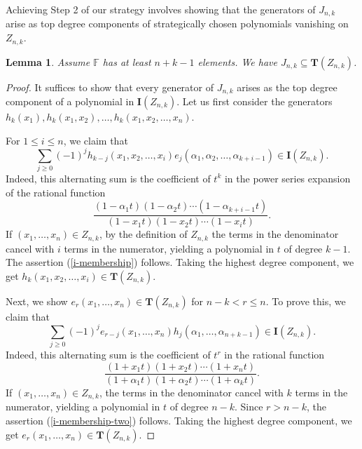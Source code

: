 \documentclass[10pt]{amsart}
\newtheorem{lemma}[theorem]{Lemma}
\theoremstyle{definition}
\newcommand{\FF}{{\mathbb{F}}}
\newcommand{\II}{{\mathbf {I}}}
\newcommand{\TT}{{\mathbf {T}}}
\begin{document}
Achieving Step 2 of our strategy involves showing that the generators of $J_{n,k}$ arise as 
top degree components of strategically chosen polynomials vanishing on $Z_{n,k}$.

\begin{lemma}
\label{j-contained-in-t}
Assume $\FF$ has at least $n+k-1$ elements.  We have $J_{n,k} \subseteq \TT(Z_{n,k})$.
\end{lemma}

\begin{proof}
It suffices to show that every generator of $J_{n,k}$ arises as the top degree component of a polynomial
in $\II(Z_{n,k})$.  Let us first consider the generators $h_k(x_1), h_k(x_1, x_2), \dots, h_k(x_1, x_2, \dots, x_n)$.

For $1 \leq i \leq n$, we claim that
\begin{equation}
\label{i-membership}
\sum_{j \geq 0} (-1)^j h_{k-j}(x_1, x_2, \dots, x_i) e_j(\alpha_1, \alpha_2, \dots, \alpha_{k+i-1}) \in \II(Z_{n,k}).
\end{equation}
Indeed, this alternating sum is the coefficient of $t^k$ in the power series expansion of the rational function
\begin{equation}
\frac{(1-\alpha_1 t)(1 - \alpha_2 t) \cdots (1 - \alpha_{k+i-1} t)}{(1 - x_1 t) (1 - x_2 t) \cdots (1 - x_i t)}.
\end{equation}
If $(x_1, \dots, x_n) \in Z_{n,k}$, by the definition of $Z_{n,k}$ the
 terms in the denominator cancel with $i$ terms in the numerator, yielding a polynomial
in $t$ of degree $k-1$.  
The assertion (\ref{i-membership}) follows.
Taking the highest degree component, we get
$h_k(x_1, x_2, \dots, x_i) \in \TT(Z_{n,k})$.

Next, we show $e_r(x_1, \dots, x_n) \in \TT(Z_{n,k})$ for $n-k < r \leq n$.  To prove this, we claim that
\begin{equation}
\label{i-membership-two}
\sum_{j \geq 0} (-1)^j e_{r-j}(x_1, \dots, x_n) h_j(\alpha_1, \dots, \alpha_{n+k-1}) \in \II(Z_{n,k}).
\end{equation}
Indeed, this alternating sum is the coefficient of $t^r$ in the rational function
\begin{equation}
\frac{(1 + x_1 t) (1 + x_2 t) \cdots (1 + x_n t)}{(1 + \alpha_1 t) (1 + \alpha_2 t) \cdots (1 + \alpha_k t)}.
\end{equation}
If $(x_1, \dots, x_n) \in Z_{n,k}$, the terms in the denominator cancel with $k$ terms in the numerator, yielding a polynomial
in $t$ of degree $n-k$.  Since $r > n-k$, the assertion (\ref{i-membership-two}) follows.
Taking the highest degree component, we get
$e_r(x_1, \dots, x_n) \in \TT(Z_{n,k})$.
\end{proof}
\end{document}
